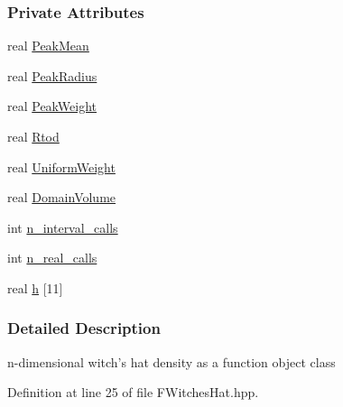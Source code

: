 \subsubsection*{\-Private \-Attributes}
\begin{DoxyCompactItemize}
\item 
real \hyperlink{classFWitchesHat_aad2c11957a2edf796a2728f2b0bf838e}{\-Peak\-Mean}
\item 
real \hyperlink{classFWitchesHat_a94abd4eea4b5e4623446a2688bd8c849}{\-Peak\-Radius}
\item 
real \hyperlink{classFWitchesHat_a6bc557f3f9e39384c3273551d599120c}{\-Peak\-Weight}
\item 
real \hyperlink{classFWitchesHat_aadb3c71d235e5857a08fccb5b6a1ffef}{\-Rtod}
\item 
real \hyperlink{classFWitchesHat_adb3a9d40df656e50327d3c40c505fdb6}{\-Uniform\-Weight}
\item 
real \hyperlink{classFWitchesHat_a54f305164476a0d3f746be9bf6c48bb9}{\-Domain\-Volume}
\item 
int \hyperlink{classFWitchesHat_ae9af30cb2fef292d9eafe3ca42ce4b60}{n\-\_\-interval\-\_\-calls}
\item 
int \hyperlink{classFWitchesHat_ab91e3167c8275b9cec6aa913d55a2ea4}{n\-\_\-real\-\_\-calls}
\item 
real \hyperlink{classFWitchesHat_a08793da5b6fee108f85a70f9eaf67e65}{h} \mbox{[}11\mbox{]}
\end{DoxyCompactItemize}


\subsubsection{\-Detailed \-Description}
n-\/dimensional witch's hat density as a function object class 

\-Definition at line 25 of file \-F\-Witches\-Hat.\-hpp.



